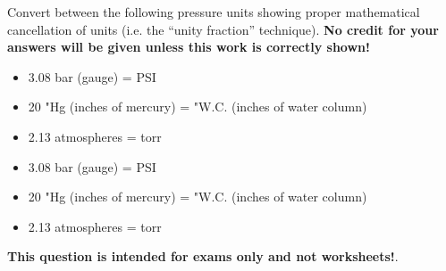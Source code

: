 

Convert between the following pressure units showing proper mathematical cancellation of units (i.e. the ``unity fraction'' technique).  {\bf No credit for your answers will be given unless this work is correctly shown!}

\begin{itemize}
\item{} 3.08 bar (gauge) = \underbar{\hskip 50pt} PSI
\item{} 20 "Hg (inches of mercury) = \underbar{\hskip 50pt} "W.C. (inches of water column)
\item{} 2.13 atmospheres = \underbar{\hskip 50pt} torr
\end{itemize}







\begin{itemize}
\item{} 3.08 bar (gauge) =  PSI
\item{} 20 "Hg (inches of mercury) =  "W.C. (inches of water column)
\item{} 2.13 atmospheres =  torr
\end{itemize}







{\bf This question is intended for exams only and not worksheets!}.



